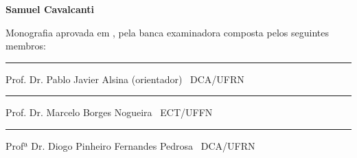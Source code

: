 %
%

\begin{titlepage}

\begin{center}

\LARGE

\textbf{\tccTitle}

\vfill

\Large

\textbf{Samuel Cavalcanti}

\end{center}

\vfill

\noindent
Monografia aprovada em \tccAptDate, pela banca examinadora composta
pelos seguintes membros:


\begin{center}

\vspace{1.5cm}\rule{0.95\linewidth}{1pt}
\parbox{0.9\linewidth}{%
Prof. Dr. Pablo Javier Alsina (orientador) \dotfill\ DCA/UFRN}


\vspace{1.5cm}\rule{0.95\linewidth}{1pt}
\parbox{0.9\linewidth}{%
Prof. Dr. Marcelo Borges Nogueira \dotfill\ ECT/UFFN}

\vspace{1.5cm}\rule{0.95\linewidth}{1pt}
\parbox{0.9\linewidth}{%
Profª Dr. Diogo Pinheiro Fernandes Pedrosa \dotfill\ DCA/UFRN}

\end{center}

\end{titlepage}

%
%


